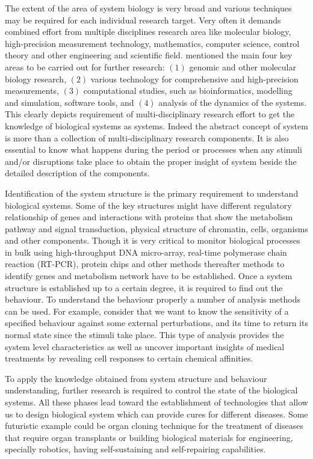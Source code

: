 The extent of the area of system biology is very broad and various techniques may be required for each individual research target. Very often it demands combined effort from multiple disciplines research area like molecular biology, high-precision measurement technology, mathematics, computer science, control theory and other engineering and scientific field. \cite{Kitano:2002} mentioned the main four key areas to be carried out for further research: $(1)$ genomic and other molecular biology research, $(2)$ various technology for comprehensive and high-precision measurements, $(3)$ computational studies, such as bioinformatics, modelling and simulation, software tools, and $(4)$ analysis of the dynamics of the systems. This clearly depicts requirement of multi-disciplinary research effort to get the knowledge of biological systems as systems. Indeed the abstract concept of system is more than a collection of multi-disciplinary research components. It is also essential to know what happens during the period or processes when any stimuli and/or disruptions take place to obtain the proper insight of system beside the detailed description of the components.

Identification of the system structure is the primary requirement to understand biological systems. Some of the key structures might have different regulatory relationship of genes and interactions with proteins that show the metabolism pathway and signal transduction, physical structure of chromatin, cells, organisms and other components. Though it is very critical to monitor biological processes in bulk using high-throughput DNA micro-array, real-time polymerase chain reaction (RT-PCR), protein chips and other methods thereafter methods to identify genes and metabolism network have to be established. Once a system structure is established up to a certain degree, it is required to find out the behaviour. To understand the behaviour properly a number of analysis methods can be used. For example, consider that we want to know the sensitivity of a specified behaviour against some external perturbations, and its time to return its normal state since the stimuli take place. This type of analysis provides the system level characteristics as well as uncover important insights of medical treatments by revealing cell responses to certain chemical affinities. 

To apply the knowledge obtained from system structure and behaviour understanding, further research is required to control the state of the biological systems. All these phases lead toward the establishment of technologies that allow us to design biological system which can provide cures for different diseases. Some futuristic example could be organ cloning technique for the treatment of diseases that require organ transplants or building biological materials for engineering, specially robotics, having self-sustaining and self-repairing capabilities.

